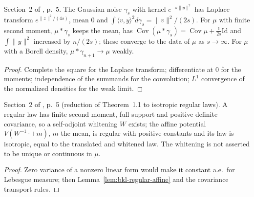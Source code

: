 \begin{lemma}
  \label{lem:bkl-gaussian-moments}
  \leanok
  Section~2 of \cite{BizeulKlartagLehec2026}, p.~5. The Gaussian noise $\gamma_s$ with kernel
  $e^{-s\|y\|^2}$ has Laplace transform $e^{\|z\|^2/(4s)}$, mean $0$ and
  $\int\langle v,y\rangle^2d\gamma_s=\|v\|^2/(2s)$. For $\mu$ with finite second moment,
  $\mu*\gamma_s$ keeps the mean, has $\operatorname{Cov}(\mu*\gamma_s)=\operatorname{Cov}\mu+\tfrac1{2s}\mathrm{Id}$
  and $\int\|y\|^2$ increased by $n/(2s)$; these converge to the data of $\mu$ as $s\to\infty$.
  For $\mu$ with a Borell density, $\mu*\gamma_{n+1}\to\mu$ weakly.
\end{lemma}
\begin{proof}
  \leanok
  Complete the square for the Laplace transform; differentiate at $0$ for the moments;
  independence of the summands for the convolution; $L^1$ convergence of the normalized
  densities for the weak limit.
\end{proof}

\begin{lemma}
  \label{lem:bkl-regular-isotropic}
  \leanok
  Section~2 of \cite{BizeulKlartagLehec2026}, p.~5 (reduction of Theorem~1.1 to isotropic regular
  laws). A regular law has finite second moment, full support and positive definite covariance,
  so a self-adjoint whitening $W$ exists; the affine potential $V(W^{-1}\cdot+m)$, $m$ the mean,
  is regular with positive constants and its law is isotropic, equal to the translated and
  whitened law. The whitening is not asserted to be unique or continuous in $\mu$.
\end{lemma}
\begin{proof}
  \leanok
  Zero variance of a nonzero linear form would make it constant a.e.\ for Lebesgue measure;
  then Lemma~\ref{lem:bkl-regular-affine} and the covariance transport rules.
\end{proof}

